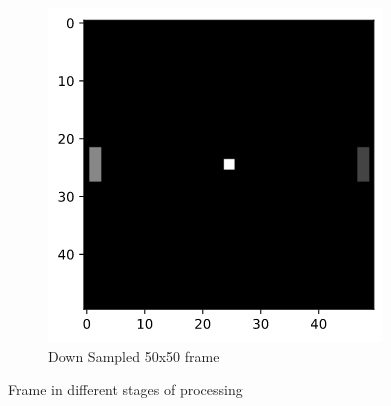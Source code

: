 \begin{figure}[htb!]
    \begin{subfigure}{0.49\textwidth}
        \centering
        \includegraphics[scale=0.53]{figures/small.png}
        \caption{Down Sampled 50x50 frame}
    \end{subfigure}
    \caption{Frame in different stages of processing}
    \label{fig-small}
    \label{fig-process}
\end{figure}

\pagebreak